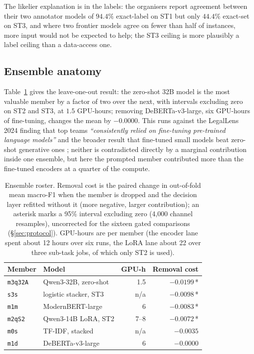 \documentclass[11pt]{article}
\newcommand{\lab}[1]{\texttt{\small #1}}
\begin{document}
The likelier explanation is in the labels: the organisers report agreement between their two
annotator models of $94.4\%$ exact-label on ST1 but only $44.4\%$ exact-set on ST3, and where
two frontier models agree on fewer than half of instances, more input would not be expected
to help; the ST3 ceiling is more plausibly a label ceiling than a data-access one.

\subsection{Ensemble anatomy}
\label{sec:anatomy}

Table~\ref{tab:members} gives the leave-one-out result: the zero-shot 32B model is the most
valuable member by a factor of two over the next, with intervals excluding zero on ST2 and ST3,
at $1.5$ GPU-hours; removing DeBERTa-v3-large, six GPU-hours of fine-tuning, changes the mean by
$-0.0000$. This runs against the LegalLens 2024 finding that top teams \emph{``consistently
relied on fine-tuning pre-trained language models''} \cite{hagag2024legallens,tran2024deberta}
and the broader result that fine-tuned small models beat zero-shot generative ones
\cite{bucher2024finetuned}; neither is contradicted directly by a marginal contribution inside
one ensemble, but here the prompted member contributed more than the fine-tuned encoders at a
quarter of the compute.

\begin{table}[t]
\centering\small
\setlength{\tabcolsep}{3.2pt}
\begin{tabular}{@{}llrr@{}}
\toprule
Member & Model & GPU-h & Removal cost \\
\midrule
\lab{m3q32A} & Qwen3-32B, zero-shot & 1.5 & $-0.0199$\,* \\
\lab{s3s}    & logistic stacker, ST3 & n/a & $-0.0098$\,* \\
\lab{m1m}    & ModernBERT-large      & 6 & $-0.0083$\,* \\
\lab{m2qS2}  & Qwen3-14B LoRA, ST2   & 7--8 & $-0.0072$\,* \\
\lab{m0s}    & TF-IDF, stacked       & n/a & $-0.0035$ \\
\lab{m1d}    & DeBERTa-v3-large      & 6 & $-0.0000$ \\
\bottomrule
\end{tabular}
\caption{Ensemble roster. Removal cost is the paired change in out-of-fold mean macro-F1 when
the member is dropped and the decision layer refitted without it (more negative, larger
contribution); an asterisk marks a 95\% interval excluding zero (4{,}000 channel resamples),
uncorrected for the sixteen gated comparisons (\S\ref{sec:protocol}). GPU-hours are per member
(the encoder lane spent about 12 hours over six runs, the LoRA lane about 22 over three
sub-task jobs, of which only ST2 is used).}
\label{tab:members}
\end{table}
\end{document}
